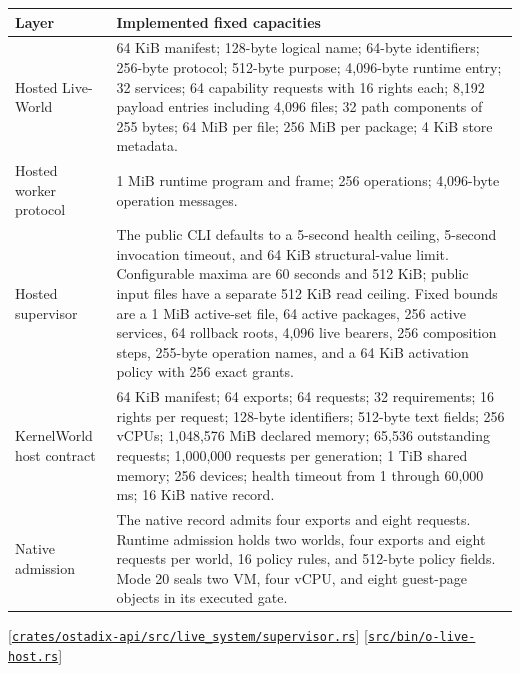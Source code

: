 \documentclass[11pt,oneside]{article}
\newcommand{\src}[1]{\textcolor{OSlate}{\scriptsize[\href{https://github.com/lostadi/OSTADIX/blob/c0b02c326b2329a95ba52447c7180bc93957cd57/#1}{\nolinkurl{#1}}]}\allowbreak}
\begin{document}
\begin{longtable}{P{0.21\textwidth} P{0.71\textwidth}}
\toprule
\textbf{Layer} & \textbf{Implemented fixed capacities} \\
\midrule
\endhead
Hosted Live-World &
64 KiB manifest; 128-byte logical name; 64-byte identifiers; 256-byte
protocol; 512-byte purpose; 4,096-byte runtime entry; 32 services; 64
capability requests with 16 rights each; 8,192 payload entries including
4,096 files; 32 path components of 255 bytes; 64 MiB per file; 256 MiB per
package; 4 KiB store metadata. \\
Hosted worker protocol &
1 MiB runtime program and frame; 256 operations; 4,096-byte operation
messages. \\
Hosted supervisor &
The public CLI defaults to a 5-second health ceiling, 5-second invocation
timeout, and 64 KiB structural-value limit. Configurable maxima are 60 seconds
and 512 KiB; public input files have a separate 512 KiB read ceiling. Fixed
bounds are a 1 MiB active-set file, 64 active packages, 256 active services,
64 rollback roots, 4,096 live bearers, 256 composition steps, 255-byte
operation names, and a 64 KiB activation policy with 256 exact grants. \\
KernelWorld host contract &
64 KiB manifest; 64 exports; 64 requests; 32 requirements; 16 rights per
request; 128-byte identifiers; 512-byte text fields; 256 vCPUs; 1,048,576 MiB
declared memory; 65,536 outstanding requests; 1,000,000 requests per
generation; 1 TiB shared memory; 256 devices; health timeout from 1 through
60,000 ms; 16 KiB native record. \\
Native admission &
The native record admits four exports and eight requests. Runtime admission
holds two worlds, four exports and eight requests per world, 16 policy rules,
and 512-byte policy fields. Mode 20 seals two VM, four vCPU, and eight
guest-page objects in its executed gate. \\
\bottomrule
\end{longtable}
\src{crates/ostadix-api/src/live_system/supervisor.rs}
\src{src/bin/o-live-host.rs}
\end{document}
